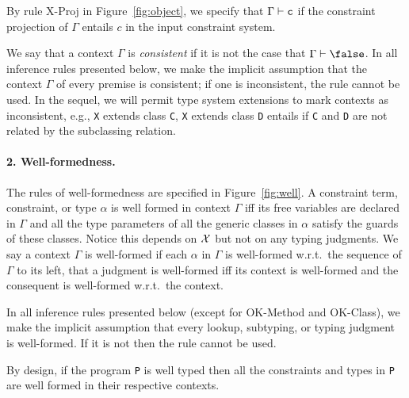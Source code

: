 By rule {\sc X-Proj} in Figure~\ref{fig:object}, we specify that $\Gamma\vdash{\tt c}$ if the constraint projection of $\Gamma$ entails $c$ in the input constraint system. %

We say that a context $\Gamma$ is {\em consistent} if it is not the case that $\Gamma\vdash\false$.
In all inference rules presented below, we make the implicit assumption that the context $\Gamma$ of every premise is consistent; if one is inconsistent, the rule cannot be used. In the sequel, we will permit type system extensions to mark contexts as inconsistent, e.g., {\tt X} extends class {\tt C}, {\tt X} extends class {\tt D} entails \false{} if {\tt C} and {\tt D} are not related by the subclassing relation.


\paragraph{2. Well-formedness.} The rules of well-formedness are specified in Figure~\ref{fig:well}. A constraint term, constraint, or type $\alpha$ is well formed in context $\Gamma$ iff its free variables are declared in $\Gamma$ and all the type parameters of all the generic classes in $\alpha$ satisfy the guards of these classes. Notice this depends on $\cal X$ but not on any typing judgments. We say a context $\Gamma$ is well-formed if each $\alpha$ in $\Gamma$ is well-formed w.r.t.\ the sequence of $\Gamma$ to its left, that a judgment is well-formed iff its context is well-formed and the consequent is well-formed w.r.t.\ the context.

In all inference rules presented below (except for {\sc OK-Method} and {\sc OK-Class}), we make the implicit assumption that every lookup, subtyping, or typing judgment is well-formed. If it is not then the rule cannot be used.

By design, if the program {\tt P} is well typed then all the constraints and types in {\tt P} are well formed in their respective contexts.

